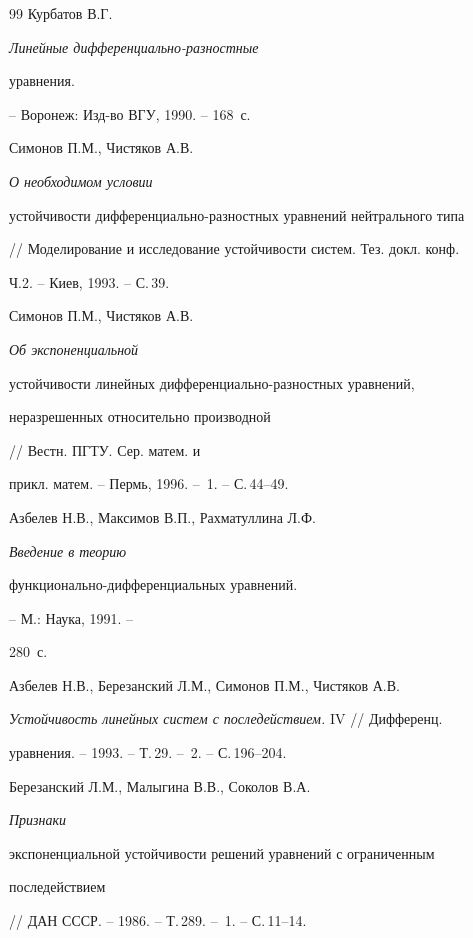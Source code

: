 \begin{thebibliography}{99}
Курбатов В.Г. {\em Линейные дифференциально-разностные


уравнения.} -- Воронеж: Изд-во ВГУ, 1990. -- 168~с.







Симонов П.М., Чистяков А.В. {\em О необходимом условии


устойчивости дифференциально-разностных уравнений нейтрального типа}


// Моделирование и исследование устойчивости систем. Тез. докл. конф.


Ч.2. -- Киев, 1993. -- С.\,39.







Симонов П.М., Чистяков А.В. {\em Об экспоненциальной


устойчивости линейных дифференциально-разностных уравнений,


неразрешенных относительно производной} // Вестн. ПГТУ. Сер. матем. и


прикл. матем. -- Пермь, 1996. -- \No\,1. -- С.\,44--49.







Азбелев Н.В., Максимов В.П., Рахматуллина Л.Ф. {\em Введение в теорию


функционально-дифференциальных уравнений.} -- М.: Наука, 1991. --


280~с.







Азбелев Н.В., Березанский Л.М., Симонов П.М., Чистяков А.В.


{\em Устойчивость линейных систем с последействием.} IV // Дифференц.


уравнения. -- 1993. -- Т.\,29. -- \No\,2. -- С.\,196--204.







Березанский Л.М., Малыгина В.В., Соколов В.А. {\em Признаки


экспоненциальной устойчивости решений уравнений с ограниченным


последействием} // ДАН СССР. -- 1986. -- Т.\,289. -- \No\,1. -- С.\,11--14.






\end{thebibliography}
